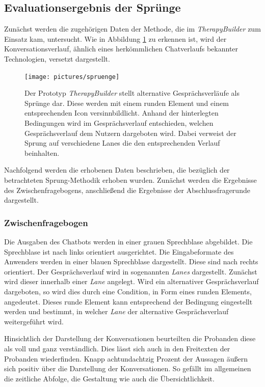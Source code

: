 \subsection{Evaluationsergebnis der Sprünge}
Zunächst werden die zugehörigen Daten der Methode, die im \emph{TherapyBuilder} zum Einsatz kam, untersucht. Wie in Abbildung \ref{spruenge} zu erkennen ist, wird der Konversationsverlauf, ähnlich eines herkömmlichen Chatverlaufs bekannter Technologien, versetzt dargestellt. 

\begin{figure}[h]
\centering
\texttt{[image: pictures/spruenge]}
\caption{Der Prototyp \emph{TherapyBuilder} stellt alternative Gesprächsverläufe als Sprünge dar. Diese werden mit einem runden Element und einem entsprechenden Icon versinnbildlicht. Anhand der hinterlegten Bedingungen wird im Gesprächsverlauf entschieden, welchen Gesprächsverlauf dem Nutzern dargeboten wird. Dabei verweist der Sprung auf verschiedene Lanes die den entsprechenden Verlauf beinhalten.}
\label{spruenge}
\end{figure}

Nachfolgend werden die erhobenen Daten beschrieben, die bezüglich der betrachteten Sprung-Methodik erhoben wurden. Zunächst werden die Ergebnisse des Zwischenfragebogens, anschließend die Ergebnisse der Abschlussfragerunde dargestellt.

\subsubsection{Zwischenfragebogen}
Die Ausgaben des Chatbots werden in einer grauen Sprechblase abgebildet. Die Sprechblase ist nach links orientiert ausgerichtet. Die Eingabeformate des Anwenders werden in einer blauen Sprechblase dargestellt. Diese sind nach rechts orientiert. Der Gesprächsverlauf wird in sogenannten \emph{Lanes} dargestellt. Zunächst wird dieser innerhalb einer \emph{Lane} angelegt. Wird ein alternativer Gesprächsverlauf dargeboten, so wird dies durch eine Condition, in Form eines runden Elements, angedeutet. Dieses runde Element kann entsprechend der Bedingung eingestellt werden und bestimmt, in welcher \emph{Lane} der alternative Gesprächsverlauf weitergeführt wird. 


Hinsichtlich der Darstellung der Konversationen beurteilten die Probanden diese als voll und ganz verständlich. Dies lässt sich auch in den Freitexten der Probanden wiederfinden. Knapp achtundachtzig Prozent der Aussagen äußern sich positiv über die Darstellung der Konversationen. So gefällt im allgemeinen die zeitliche Abfolge, die Gestaltung wie auch die Übersichtlichkeit. 

